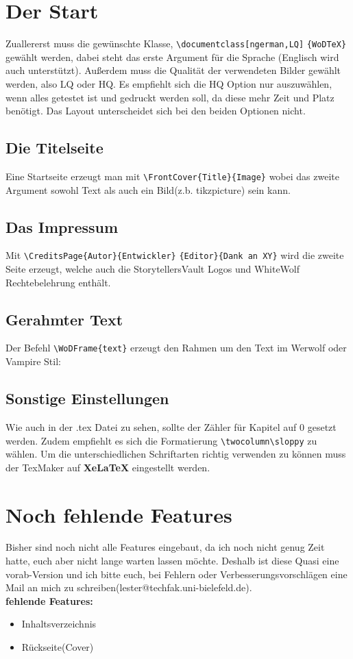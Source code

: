 \documentclass[ngerman,LQ,Vampire]{WoDTeX}
\begin{document}
\section*{Der Start}
Zuallererst muss die gewünschte Klasse, \verb|\documentclass[ngerman,LQ]| \verb|{WoDTeX}| gewählt werden, dabei steht das erste Argument für die Sprache (Englisch wird auch unterstützt). Außerdem muss die Qualität der verwendeten Bilder gewählt werden, also LQ oder HQ. Es empfiehlt sich die HQ Option nur auszuwählen, wenn alles getestet ist und gedruckt werden soll, da diese mehr Zeit und Platz benötigt. Das Layout unterscheidet sich bei den beiden Optionen nicht. 
\subsection*{Die Titelseite}
Eine Startseite erzeugt man mit \verb|\FrontCover{Title}{Image}| wobei das zweite Argument sowohl Text als auch ein Bild(z.b. tikzpicture) sein kann.
\subsection*{Das Impressum}
Mit \verb|\CreditsPage{Autor}{Entwickler}| \verb|{Editor}{Dank an XY}| wird die zweite Seite erzeugt, welche auch die StorytellersVault Logos und WhiteWolf Rechtebelehrung enthält.
\newpage
\subsection*{Gerahmter Text}
Der Befehl \verb|\WoDFrame{text}| erzeugt den Rahmen um den Text im Werwolf oder Vampire Stil:\\
\WoDFrame{\blindtext}
\subsection*{Sonstige Einstellungen}
Wie auch in der .tex Datei zu sehen, sollte der Zähler für Kapitel auf 0 gesetzt werden. Zudem empfiehlt es sich die Formatierung \verb|\twocolumn\sloppy| zu wählen. Um die unterschiedlichen Schriftarten richtig verwenden zu können muss der TexMaker auf \textbf{XeLaTeX} eingestellt werden.
\section*{Noch fehlende Features}
Bisher sind noch nicht alle Features eingebaut, da ich noch nicht genug Zeit hatte, euch aber nicht lange warten lassen möchte. Deshalb ist diese Quasi eine vorab-Version und ich bitte euch, bei Fehlern oder Verbesserungsvorschlägen eine Mail an mich zu schreiben(lester@techfak.uni-bielefeld.de).\\
\textbf{fehlende Features:}
\begin{itemize}
\item Inhaltsverzeichnis
\item Rückseite(Cover)
\end{itemize}
\end{document}
